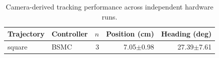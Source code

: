 \begin{table}[!t]
\centering
\caption{Camera-derived tracking performance across independent hardware runs.}
\label{tab:tracking}
\begin{tabular}{llrrr}
\hline
Trajectory & Controller & $n$ & Position (cm) & Heading (deg) \\
\hline
square & BSMC & 3 & 7.05$\pm$0.98 & 27.39$\pm$7.61 \\
\hline
\end{tabular}
\end{table}
